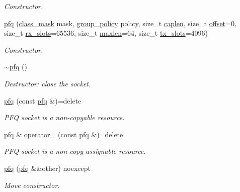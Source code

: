 \begin{DoxyCompactItemize}
\begin{DoxyCompactList}\small\item\em Constructor. \end{DoxyCompactList}\item 
\hyperlink{classnet_1_1pfq_a829b17b7f6b5471512a05003c77c68e2}{pfq} (\hyperlink{namespacenet_a1dbd93552dc6ef6fbb0bb79d43ca22fd}{class\-\_\-mask} mask, \hyperlink{namespacenet_aedc1a0dde937ddbd0800af02920b1067}{group\-\_\-policy} policy, size\-\_\-t \hyperlink{classnet_1_1pfq_aa915603b2ad8d1226f9bbea0050945c0}{caplen}, size\-\_\-t \hyperlink{classnet_1_1pfq_a83ed78c8c7bc2de33e75e244bbc0b603}{offset}=0, size\-\_\-t \hyperlink{classnet_1_1pfq_a878c768492c68fc572a994a58913a3db}{rx\-\_\-slots}=65536, size\-\_\-t \hyperlink{classnet_1_1pfq_a0424e39990711493af4f24a0c3e9be4d}{maxlen}=64, size\-\_\-t \hyperlink{classnet_1_1pfq_aae98015b961c6210081fa29a2ea34da2}{tx\-\_\-slots}=4096)
\begin{DoxyCompactList}\small\item\em Constructor. \end{DoxyCompactList}\item 
\hyperlink{classnet_1_1pfq_acf552123cd0e53eb5b96a4e1eb1b50a2}{$\sim$pfq} ()
\begin{DoxyCompactList}\small\item\em Destructor\-: close the socket. \end{DoxyCompactList}\item 
\hyperlink{classnet_1_1pfq_aafcf0308f9f4a0da319b8b688b2ad3a9}{pfq} (const \hyperlink{classnet_1_1pfq}{pfq} \&)=delete
\begin{DoxyCompactList}\small\item\em P\-F\-Q socket is a non-\/copyable resource. \end{DoxyCompactList}\item 
\hyperlink{classnet_1_1pfq}{pfq} \& \hyperlink{classnet_1_1pfq_a6a00af55f2109382c2cc20a47da43623}{operator=} (const \hyperlink{classnet_1_1pfq}{pfq} \&)=delete
\begin{DoxyCompactList}\small\item\em P\-F\-Q socket is a non-\/copy assignable resource. \end{DoxyCompactList}\item 
\hyperlink{classnet_1_1pfq_acce7496d2c4308539cc0360793683acd}{pfq} (\hyperlink{classnet_1_1pfq}{pfq} \&\&other) noexcept
\begin{DoxyCompactList}\small\item\em Move constructor. \end{DoxyCompactList}\item 

\end{DoxyCompactItemize}
